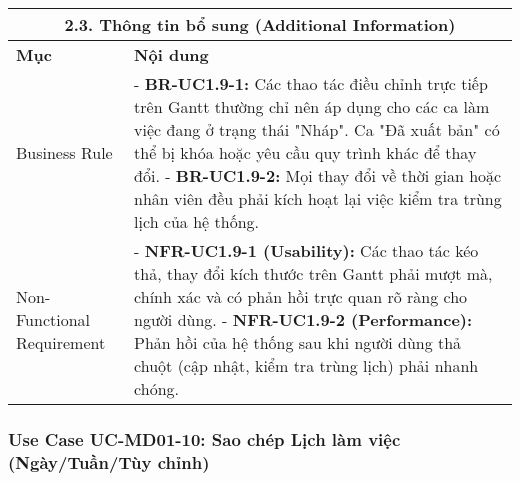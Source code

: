 \begin{longtable}{|m{4cm}|p{11cm}|}
\hline
\multicolumn{2}{|c|}{\textbf{2.3. Thông tin bổ sung (Additional Information)}} \\
\hline
\textbf{Mục} & \textbf{Nội dung} \\
\hline
Business Rule & - \textbf{BR-UC1.9-1:} Các thao tác điều chỉnh trực tiếp trên Gantt thường chỉ nên áp dụng cho các ca làm việc đang ở trạng thái "Nháp". Ca "Đã xuất bản" có thể bị khóa hoặc yêu cầu quy trình khác để thay đổi. \newline - \textbf{BR-UC1.9-2:} Mọi thay đổi về thời gian hoặc nhân viên đều phải kích hoạt lại việc kiểm tra trùng lịch của hệ thống. \\
\hline
Non-Functional Requirement & - \textbf{NFR-UC1.9-1 (Usability):} Các thao tác kéo thả, thay đổi kích thước trên Gantt phải mượt mà, chính xác và có phản hồi trực quan rõ ràng cho người dùng. \newline - \textbf{NFR-UC1.9-2 (Performance):} Phản hồi của hệ thống sau khi người dùng thả chuột (cập nhật, kiểm tra trùng lịch) phải nhanh chóng. \\
\hline
\end{longtable}

\subsubsection{Use Case UC-MD01-10: Sao chép Lịch làm việc (Ngày/Tuần/Tùy chỉnh)}

